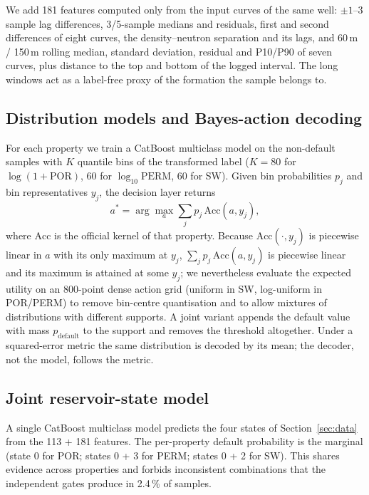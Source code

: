 \documentclass[preprint,12pt]{elsarticle}
\begin{document}
We add 181 features computed only from the input curves of the same well: $\pm1$--3 sample lag differences, 3/5-sample medians and residuals, first and second differences of eight curves, the density--neutron separation and its lags, and 60\,m / 150\,m rolling median, standard deviation, residual and P10/P90 of seven curves, plus distance to the top and bottom of the logged interval. The long windows act as a label-free proxy of the formation the sample belongs to.

\subsection{Distribution models and Bayes-action decoding}
\label{sec:decision}

For each property we train a CatBoost multiclass model on the non-default samples with $K$ quantile bins of the transformed label ($K=80$ for $\log(1+\mathrm{POR})$, 60 for $\log_{10}\mathrm{PERM}$, 60 for SW). Given bin probabilities $p_j$ and bin representatives $y_j$, the decision layer returns
\begin{equation}
a^{*}=\arg\max_{a}\sum_{j} p_j\,\mathrm{Acc}(a,y_j),
\label{eq:bayes}
\end{equation}
where $\mathrm{Acc}$ is the official kernel of that property. Because $\mathrm{Acc}(\cdot,y_j)$ is piecewise linear in $a$ with its only maximum at $y_j$, $\sum_j p_j\,\mathrm{Acc}(a,y_j)$ is piecewise linear and its maximum is attained at some $y_j$; we nevertheless evaluate the expected utility on an 800-point dense action grid (uniform in SW, log-uniform in POR/PERM) to remove bin-centre quantisation and to allow mixtures of distributions with different supports. A joint variant appends the default value with mass $p_{\mathrm{default}}$ to the support and removes the threshold altogether. Under a squared-error metric the same distribution is decoded by its mean; the decoder, not the model, follows the metric.

\subsection{Joint reservoir-state model}
\label{sec:states}

A single CatBoost multiclass model predicts the four states of Section~\ref{sec:data} from the 113 + 181 features. The per-property default probability is the marginal (state 0 for POR; states 0 + 3 for PERM; states 0 + 2 for SW). This shares evidence across properties and forbids inconsistent combinations that the independent gates produce in 2.4\,\% of samples.
\end{document}
